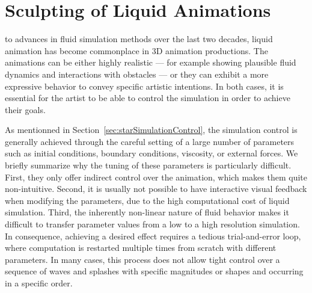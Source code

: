 \chapter[Sculpting of Liquid Animations]{Sculpting of Liquid Animations}
\label{chap:fluidsculpting}
 to advances in fluid simulation methods over the last two decades, liquid animation has become commonplace in 3D animation productions. 
The animations can be either highly realistic --- for example showing plausible fluid dynamics and interactions with obstacles --- or they can exhibit a more expressive behavior to convey specific artistic intentions. In both cases, it is essential for the artist to be able to control the simulation in order to achieve their goals.

As mentionned in Section~\ref{sec:starSimulationControl}, the simulation control is generally achieved through the careful setting of a large number of parameters such as initial conditions, boundary conditions, viscosity, or external forces. 
We briefly summarize why the tuning of these parameters is particularly difficult.
First, they only offer indirect control over the animation, which makes them quite non-intuitive. 
Second, it is usually not possible to have interactive visual feedback when modifying the parameters, due to the high computational cost of 
liquid simulation.
Third, the inherently non-linear nature of fluid behavior makes it difficult to transfer parameter values from a low to a high resolution simulation. 
In consequence, achieving a desired effect requires a tedious trial-and-error loop, where computation is restarted multiple times from scratch with different parameters. 
In many cases, this process does not allow tight control over a sequence of waves and splashes with specific magnitudes or shapes and occurring in a specific order. 

